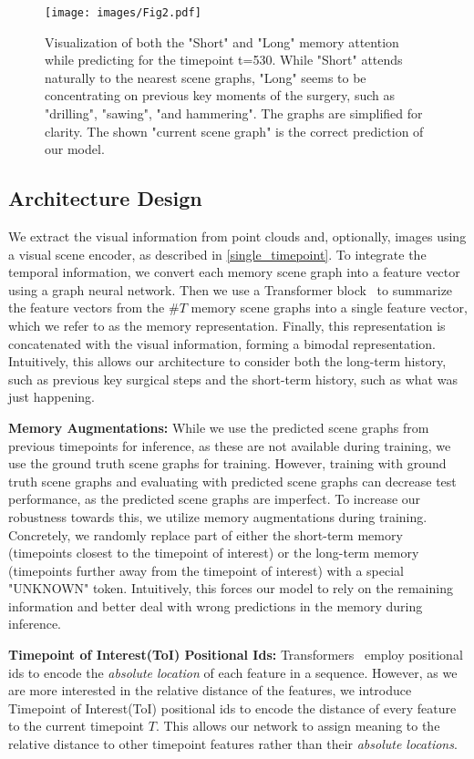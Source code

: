 \documentclass[runningheads]{llncs}
\begin{document}
\begin{figure}[hbt!]
	\centering
	\texttt{[image: images/Fig2.pdf]}
	\caption{Visualization of both the "Short" and "Long" memory attention while predicting for the timepoint t=530. While "Short" attends naturally to the nearest scene graphs, "Long" seems to be concentrating on previous key moments of the surgery, such as "drilling", "sawing", "and hammering". The graphs are simplified for clarity. The shown "current scene graph" is the correct prediction of our model.}
	\label{fig:attention_visualization}
\end{figure}

\subsection{Architecture Design}
We extract the visual information from point clouds and, optionally, images using a visual scene encoder, as described in \ref{single_timepoint}. To integrate the temporal information, we convert each memory scene graph into a feature vector using a graph neural network. Then we use a Transformer block~\cite{transformers} to summarize the feature vectors from the $\#T$ memory scene graphs into a single feature vector, which we refer to as the memory representation. Finally, this representation is concatenated with the visual information, forming a bimodal representation. Intuitively, this allows our architecture to consider both the long-term history, such as previous key surgical steps and the short-term history, such as what was just happening. 

\noindent \textbf{Memory Augmentations:}
While we use the predicted scene graphs from previous timepoints for inference, as these are not available during training, we use the ground truth scene graphs for training. However, training with ground truth scene graphs and evaluating with predicted scene graphs can decrease test performance, as the predicted scene graphs are imperfect. To increase our robustness towards this, we utilize memory augmentations during training. Concretely, we randomly replace part of either the short-term memory (timepoints closest to the timepoint of interest) or the long-term memory (timepoints further away from the timepoint of interest) with a special "UNKNOWN" token. Intuitively, this forces our model to rely on the remaining information and better deal with wrong predictions in the memory during inference. 

\noindent \textbf{Timepoint of Interest(ToI) Positional Ids:}
Transformers~\cite{transformers} employ positional ids to encode the \textit{absolute location} of each feature in a sequence. However, as we are more interested in the relative distance of the features, we introduce Timepoint of Interest(ToI) positional ids to encode the distance of every feature to the current timepoint $T$. This allows our network to assign meaning to the relative distance to other timepoint features rather than their \textit{absolute locations}.
\end{document}
